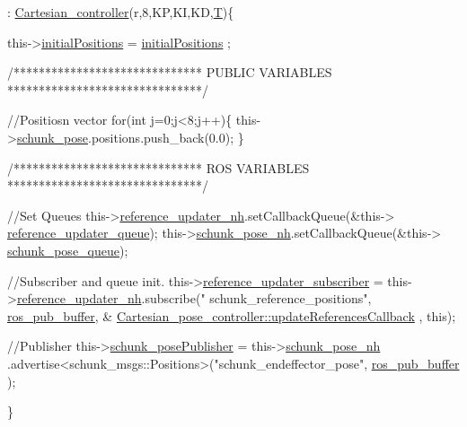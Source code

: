 \begin{DoxyCode}
                                                                               
                                                                        : 
      \hyperlink{classCartesian__controller_a71055bb1cbf01ced9e64bb1d184b68fe}{Cartesian\_controller}(r,8,KP,KI,KD,\hyperlink{classCartesian__controller_a35c6ddbb9624878f2807ff644a33e832}{T})\{


        this->\hyperlink{classCartesian__pose__controller_a42433d7f2e4e03ccaac56e1f9a7a5027}{initialPositions} = \hyperlink{classCartesian__pose__controller_a42433d7f2e4e03ccaac56e1f9a7a5027}{initialPositions}
      ;

        \textcolor{comment}{/******************************}
\textcolor{comment}{                 PUBLIC VARIABLES}
\textcolor{comment}{        *******************************/}

        \textcolor{comment}{//Positiosn vector}
        \textcolor{keywordflow}{for}(\textcolor{keywordtype}{int} j=0;j<8;j++)\{
                this->\hyperlink{classCartesian__pose__controller_a301bc44e901e4837cf036661478354c4}{schunk\_pose}.positions.push\_back(0.0);
        \}

        \textcolor{comment}{/******************************}
\textcolor{comment}{                  ROS VARIABLES}
\textcolor{comment}{        *******************************/}

        \textcolor{comment}{//Set Queues}
        this->\hyperlink{classCartesian__pose__controller_ab2d5fe68c8229b6c90f84ac1601eb637}{reference\_updater\_nh}.setCallbackQueue(&this->
      \hyperlink{classCartesian__pose__controller_a6eea82d82ccd6c925be31c18e1b4a432}{reference\_updater\_queue});
        this->\hyperlink{classCartesian__pose__controller_a41a692189fed59ec8ec8460539f63c66}{schunk\_pose\_nh}.setCallbackQueue(&this->
      \hyperlink{classCartesian__pose__controller_a5efe52a57e5239b3fd86ff456e94691b}{schunk\_pose\_queue});

        \textcolor{comment}{//Subscriber and queue init.}
        this->\hyperlink{classCartesian__pose__controller_a9394ae99649279f815c234b1ca7801b6}{reference\_updater\_subscriber}         
      = this->\hyperlink{classCartesian__pose__controller_ab2d5fe68c8229b6c90f84ac1601eb637}{reference\_updater\_nh}.subscribe(\textcolor{stringliteral}{"
      schunk\_reference\_positions"}, \hyperlink{classCartesian__controller_ab9ed5a808da204dbc612d313dc7332f4}{ros\_pub\_buffer}, &
      \hyperlink{classCartesian__pose__controller_af9c1ec1f565375f50f8a15b16464f94d}{Cartesian\_pose\_controller::updateReferencesCallback}
      , \textcolor{keyword}{this});

        \textcolor{comment}{//Publisher}
        this->\hyperlink{classCartesian__pose__controller_a9eb38e771e5006950b9a8075a0ea7e49}{schunk\_posePublisher}   = this->\hyperlink{classCartesian__pose__controller_a41a692189fed59ec8ec8460539f63c66}{schunk\_pose\_nh}
      .advertise<schunk\_msgs::Positions>(\textcolor{stringliteral}{"schunk\_endeffector\_pose"}, \hyperlink{classCartesian__controller_ab9ed5a808da204dbc612d313dc7332f4}{ros\_pub\_buffer}
      );

\}
\end{DoxyCode}
